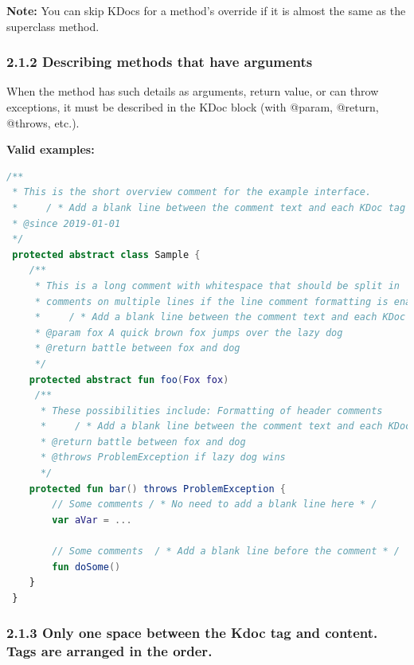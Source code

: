 {{{{{{{{{{{{{{{{\textbf{Note:} You can skip KDocs for a method's override if it is almost the same as the superclass method.



\subsubsection*{\textbf{2.1.2 Describing methods that have arguments}}
\leavevmode\newline

\label{sec:2.1.2}



When the method has such details as arguments, return value, or can throw exceptions, it must be described in the KDoc block (with @param, @return, @throws, etc.).



\textbf{Valid examples:}



\begin{lstlisting}[language=Kotlin]
/** 
 * This is the short overview comment for the example interface.
 *     / * Add a blank line between the comment text and each KDoc tag underneath * /
 * @since 2019-01-01
 */
 protected abstract class Sample {
    /**
     * This is a long comment with whitespace that should be split in 
     * comments on multiple lines if the line comment formatting is enabled.
     *     / * Add a blank line between the comment text and each KDoc tag underneath * /
     * @param fox A quick brown fox jumps over the lazy dog
     * @return battle between fox and dog 
     */
    protected abstract fun foo(Fox fox)
     /**
      * These possibilities include: Formatting of header comments
      *     / * Add a blank line between the comment text and each KDoc tag underneath * /
      * @return battle between fox and dog
      * @throws ProblemException if lazy dog wins
      */
    protected fun bar() throws ProblemException {
        // Some comments / * No need to add a blank line here * /   
        var aVar = ...

        // Some comments  / * Add a blank line before the comment * /   
        fun doSome()
    }
 }
\end{lstlisting}


\subsubsection*{\textbf{2.1.3 Only one space between the Kdoc tag and content. Tags are arranged in the order.}}
\leavevmode\newline

}}}}}}}}}}}}}}}}
